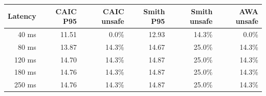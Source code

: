 \begin{tabular}{rrrrrr}\toprule
Latency & CAIC P95 & CAIC unsafe & Smith P95 & Smith unsafe & AWA unsafe\\
\midrule
40 ms & 11.51 & 0.0\% & 12.93 & 14.3\% & 0.0\%\\
80 ms & 13.87 & 14.3\% & 14.67 & 25.0\% & 14.3\%\\
120 ms & 14.70 & 14.3\% & 14.87 & 25.0\% & 14.3\%\\
180 ms & 14.76 & 14.3\% & 14.87 & 25.0\% & 14.3\%\\
250 ms & 14.76 & 14.3\% & 14.87 & 25.0\% & 14.3\%\\
\bottomrule\end{tabular}

